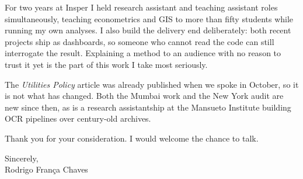 For two years at Insper I held research assistant and teaching assistant roles simultaneously, teaching econometrics and GIS to more than fifty students while running my own analyses. I also build the delivery end deliberately: both recent projects ship as dashboards, so someone who cannot read the code can still interrogate the result. Explaining a method to an audience with no reason to trust it yet is the part of this work I take most seriously.

The \textit{Utilities Policy} article was already published when we spoke in October, so it is not what has changed. Both the Mumbai work and the New York audit are new since then, as is a research assistantship at the Mansueto Institute building OCR pipelines over century-old archives.

Thank you for your consideration. I would welcome the chance to talk.

\vspace{6pt}

Sincerely, \\
Rodrigo França Chaves


